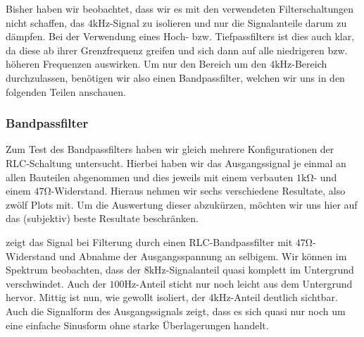 Bisher haben wir beobachtet, dass wir es mit den verwendeten Filterschaltungen nicht schaffen, das  $4\si{\kilo\hertz}$-Signal zu isolieren und nur die Signalanteile darum zu dämpfen. Bei der Verwendung eines Hoch- bzw. Tiefpassfilters ist dies auch klar, da diese ab ihrer Grenzfrequenz greifen und sich dann auf alle niedrigeren bzw. höheren Frequenzen auswirken. Um nur den Bereich um den $4\si{\kilo\hertz}$-Bereich durchzulassen, benötigen wir also einen Bandpassfilter, welchen wir uns in den folgenden Teilen anschauen.

\newpage
\subsubsection*{Bandpassfilter}

Zum Test des Bandpassfilters haben wir gleich mehrere Konfigurationen der RLC-Schaltung untersucht. Hierbei haben wir das Ausgangssignal je einmal an allen Bauteilen abgenommen und dies jeweils mit einem verbauten $1\si{\kilo\ohm}$- und einem $47\si{\ohm}$-Widerstand. Hieraus nehmen wir sechs verschiedene Resultate, also zwölf Plots mit. Um die Auswertung dieser abzukürzen, möchten wir uns hier auf das (subjektiv) beste Resultate beschränken.

 zeigt das Signal bei Filterung durch einen RLC-Bandpassfilter mit $47\si{\ohm}$-Widerstand und Abnahme der Ausgangsspannung an selbigem. Wir können im Spektrum beobachten, dass der $8\si{\kilo\hertz}$-Signalanteil quasi komplett im Untergrund verschwindet. Auch der $100\si{\hertz}$-Anteil sticht nur noch leicht aus dem Untergrund hervor. Mittig ist nun, wie gewollt isoliert, der $4\si{\kilo\hertz}$-Anteil deutlich sichtbar. Auch die Signalform des Ausgangssignals zeigt, dass es sich quasi nur noch um eine einfache Sinusform ohne starke Überlagerungen handelt.



